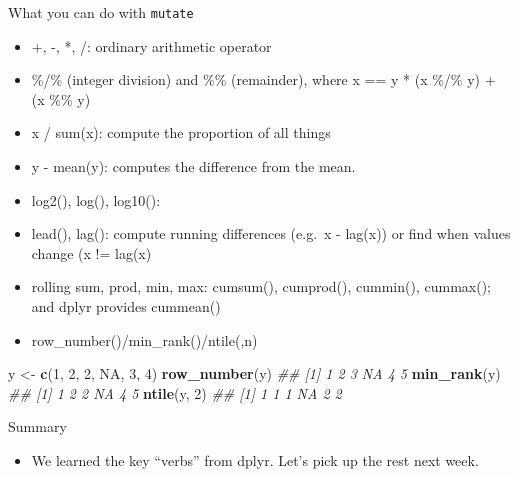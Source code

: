 \documentclass[
  10pt,
  ignorenonframetext,
  serif]{beamer}
\newenvironment{Shaded}{\begin{snugshade}}{\end{snugshade}}
\newcommand{\CommentTok}[1]{\textcolor[rgb]{0.56,0.35,0.01}{\textit{#1}}}
\newcommand{\DecValTok}[1]{\textcolor[rgb]{0.00,0.00,0.81}{#1}}
\newcommand{\KeywordTok}[1]{\textcolor[rgb]{0.13,0.29,0.53}{\textbf{#1}}}
\newcommand{\NormalTok}[1]{#1}
\newcommand{\OtherTok}[1]{\textcolor[rgb]{0.56,0.35,0.01}{#1}}
\newcommand{\StringTok}[1]{\textcolor[rgb]{0.31,0.60,0.02}{#1}}
\providecommand{\tightlist}{%
  \setlength{\itemsep}{0pt}\setlength{\parskip}{0pt}}
\begin{document}
\begin{frame}[fragile]{What you can do with \texttt{mutate}}
\protect\hypertarget{what-you-can-do-with-mutate}{}
\begin{itemize}
\tightlist
\item
  +, -, *, /: ordinary arithmetic operator
\item
  \%/\% (integer division) and \%\% (remainder), where x == y * (x \%/\%
  y) + (x \%\% y)
\item
  x / sum(x): compute the proportion of all things
\item
  y - mean(y): computes the difference from the mean.
\item
  log2(), log(), log10():
\item
  lead(), lag(): compute running differences (e.g.~x - lag(x)) or find
  when values change (x != lag(x)
\item
  rolling sum, prod, min, max: cumsum(), cumprod(), cummin(), cummax();
  and dplyr provides cummean()
\item
  row\_number()/min\_rank()/ntile(,n)
\end{itemize}

\begin{Shaded}
\begin{Highlighting}[]
\NormalTok{y \textless{}{-}}\StringTok{ }\KeywordTok{c}\NormalTok{(}\DecValTok{1}\NormalTok{, }\DecValTok{2}\NormalTok{, }\DecValTok{2}\NormalTok{, }\OtherTok{NA}\NormalTok{, }\DecValTok{3}\NormalTok{, }\DecValTok{4}\NormalTok{)}
\KeywordTok{row\_number}\NormalTok{(y)}
\CommentTok{\#\# [1]  1  2  3 NA  4  5}
\KeywordTok{min\_rank}\NormalTok{(y)}
\CommentTok{\#\# [1]  1  2  2 NA  4  5}
\KeywordTok{ntile}\NormalTok{(y, }\DecValTok{2}\NormalTok{)}
\CommentTok{\#\# [1]  1  1  1 NA  2  2}
\end{Highlighting}
\end{Shaded}
\end{frame}

\begin{frame}{Summary}
\protect\hypertarget{summary}{}
\begin{itemize}
\tightlist
\item
  We learned the key ``verbs'' from dplyr. Let's pick up the rest next
  week.
\end{itemize}
\end{frame}
\end{document}
